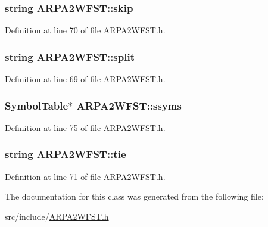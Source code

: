 \subsubsection[{skip}]{\setlength{\rightskip}{0pt plus 5cm}string A\+R\+P\+A2\+W\+F\+S\+T\+::skip}\hypertarget{class_a_r_p_a2_w_f_s_t_a5574ec74f50b2b78490e608ea10ef046}{}\label{class_a_r_p_a2_w_f_s_t_a5574ec74f50b2b78490e608ea10ef046}


Definition at line 70 of file A\+R\+P\+A2\+W\+F\+S\+T.\+h.

\subsubsection[{split}]{\setlength{\rightskip}{0pt plus 5cm}string A\+R\+P\+A2\+W\+F\+S\+T\+::split}\hypertarget{class_a_r_p_a2_w_f_s_t_aa9a5047c54dbfe3ffd799a28eb809729}{}\label{class_a_r_p_a2_w_f_s_t_aa9a5047c54dbfe3ffd799a28eb809729}


Definition at line 69 of file A\+R\+P\+A2\+W\+F\+S\+T.\+h.

\subsubsection[{ssyms}]{\setlength{\rightskip}{0pt plus 5cm}Symbol\+Table$\ast$ A\+R\+P\+A2\+W\+F\+S\+T\+::ssyms}\hypertarget{class_a_r_p_a2_w_f_s_t_a3f59b3de10e68a415f44f2f47aaadea8}{}\label{class_a_r_p_a2_w_f_s_t_a3f59b3de10e68a415f44f2f47aaadea8}


Definition at line 75 of file A\+R\+P\+A2\+W\+F\+S\+T.\+h.

\subsubsection[{tie}]{\setlength{\rightskip}{0pt plus 5cm}string A\+R\+P\+A2\+W\+F\+S\+T\+::tie}\hypertarget{class_a_r_p_a2_w_f_s_t_ab2db4a57e9b4020e3c9efda458d1355e}{}\label{class_a_r_p_a2_w_f_s_t_ab2db4a57e9b4020e3c9efda458d1355e}


Definition at line 71 of file A\+R\+P\+A2\+W\+F\+S\+T.\+h.



The documentation for this class was generated from the following file\+:\begin{DoxyCompactItemize}
\item 
src/include/\hyperlink{_a_r_p_a2_w_f_s_t_8h}{A\+R\+P\+A2\+W\+F\+S\+T.\+h}\end{DoxyCompactItemize}
